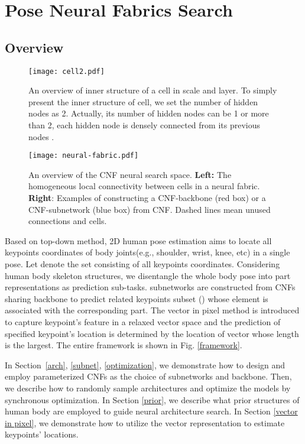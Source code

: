 \documentclass[journal]{IEEEtran}
\begin{document}
\section{Pose Neural Fabrics Search}

\subsection{Overview}

\begin{figure}
	
	\centering
\texttt{[image: cell2.pdf]}
	\caption{An overview of inner structure of a cell in scale  and  layer. To simply present the inner structure of cell, we set the number of hidden nodes  as 2. Actually, its number of hidden nodes can be 1 or more than 2, each hidden node  is densely connected from its previous nodes .   }
	\label{cell}
\end{figure}

\begin{figure*}
	
	\centering
\texttt{[image: neural-fabric.pdf]}
\caption{An overview of the CNF neural search space. \textbf{Left:} The homogeneous local connectivity between cells in a neural fabric. \textbf{Right}: Examples of constructing a CNF-backbone (red box) or a CNF-subnetwork (blue box) from CNF. Dashed lines mean unused connections and cells.}
	\label{fabric}
\end{figure*}


Based on top-down method, 2D human pose estimation aims to locate all  keypoints coordinates of body joints(e.g., shoulder, wrist, knee, etc) in a single pose. Let  denote the set consisting of all keypoints coordinates. Considering human body skeleton structures, we disentangle the whole body pose into  part representations as  prediction sub-tasks.  subnetworks are constructed from CNFs sharing backbone to  predict related keypoints subset  () whose element is associated with the corresponding part. The vector in pixel method is introduced to capture keypoint's feature in a relaxed vector space and the prediction of specified keypoint's location is determined by the location of vector  whose length is the largest. The entire framework is shown in Fig. \ref{framework}.

In Section~\ref{arch}, \ref{subnet}, \ref{optimization}, we demonstrate how to design and employ parameterized CNFs as the choice of subnetworks and backbone. Then, we describe how to randomly sample architectures and optimize the models by synchronous optimization. In Section \ref{prior}, we describe what prior structures of human body are employed to guide neural architecture search. In Section \ref{vector in pixel}, we demonstrate how to utilize the vector representation to estimate keypoints' locations.
\end{document}
